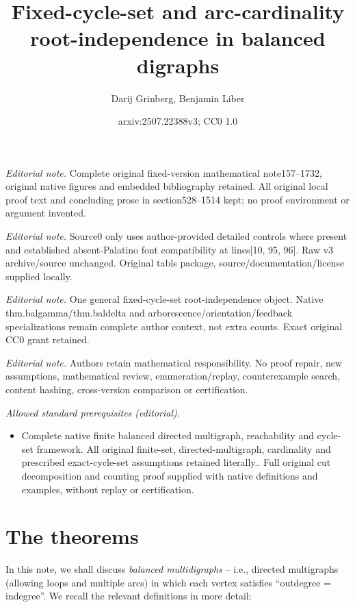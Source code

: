 \documentclass[numbers=enddot,12pt,final,onecolumn,notitlepage]{scrartcl}%
\title{Fixed-cycle-set and arc-cardinality root-independence in balanced digraphs}
\author{Darij Grinberg, Benjamin Liber}
\date{arxiv:2507.22388v3; CC0 1.0}
\theoremstyle{definition}
\theoremstyle{plainsl}
\begin{document}
\maketitle
\noindent\textit{Editorial note.} Complete original fixed-version mathematical note157--1732, original native figures and embedded bibliography retained. All original local proof text and concluding prose in section528--1514 kept; no proof environment or argument invented.\par\medskip
\noindent\textit{Editorial note.} Source0 only uses author-provided detailed controls where present and established absent-Palatino font compatibility at lines[10, 95, 96]. Raw v3 archive/source unchanged. Original tabls package, source/documentation/license supplied locally.\par\medskip
\noindent\textit{Editorial note.} One general fixed-cycle-set root-independence object. Native thm.balgamma/thm.baldelta and arborescence/orientation/feedback specializations remain complete author context, not extra counts. Exact original CC0 grant retained.\par\medskip
\noindent\textit{Editorial note.} Authors retain mathematical responsibility. No proof repair, new assumptions, mathematical review, enumeration/replay, counterexample search, content hashing, cross-version comparison or certification.\par\medskip
\noindent\textit{Allowed standard prerequisites (editorial).}\begin{itemize}
\item Complete native finite balanced directed multigraph, reachability and cycle-set framework. All original finite-set, directed-multigraph, cardinality and prescribed exact-cycle-set assumptions retained literally.. Full original cut decomposition and counting proof supplied with native definitions and examples, without replay or certification.
\end{itemize}\medskip
\section{The theorems}

In this note, we shall discuss \emph{balanced multidigraphs} -- i.e., directed
multigraphs (allowing loops and multiple arcs) in which each vertex satisfies
\textquotedblleft outdegree = indegree\textquotedblright. We recall the
relevant definitions in more detail:
\end{document}

